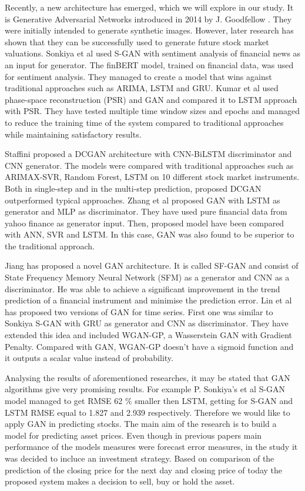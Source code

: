 \documentclass[11pt]{article} %
\begin{document}
Recently, a new architecture has emerged, which we will explore in our study. It is Generative Adversarial Networks introduced in 2014 by J. Goodfellow \cite{gan1}. They were initially intended to generate synthetic images. However, later research has shown that they can be successfully used to generate future stock market valuations. Sonkiya et al \cite{s-gan} used S-GAN with sentiment analysis of financial news as an input for generator. The finBERT model, trained on financial data, was used for sentiment analysis. They managed to create a model that wins against traditional approaches such as ARIMA, LSTM and GRU. Kumar et al  \cite{gan-stock} used phase-space reconstruction (PSR) and GAN and compared it to LSTM approach with PSR. They have tested multiple time window sizes and epochs and managed to reduce the training time of the system compared to traditional approaches while maintaining satisfactory results. 

Staffini \cite{gan-cnn} proposed a DCGAN architecture with CNN-BiLSTM discriminator and CNN generator. The models were compared with traditional approaches such as ARIMAX-SVR, Random Forest, LSTM on 10 different stock market instruments. Both in single-step and in the multi-step prediction, proposed DCGAN outperformed typical approaches. Zhang et al \cite{gan-zhang} proposed GAN with LSTM as generator and MLP as discriminator. They have used pure financial data from yahoo finance as generator input. Then, proposed model have been compared with ANN, SVR and LSTM. In this case, GAN was also found to be superior to the traditional approach.  

Jiang \cite{gan-Jjang} has proposed a novel GAN architecture. It is called SF-GAN and consist of 
State Frequency Memory Neural Network (SFM) as a generator and CNN as a discriminator. 
He was able to achieve a significant improvement in the trend prediction of a financial instrument and minimise the prediction error.  Lin et al \cite{gan-lin} has proposed two versions of GAN for time series. First one was similar to Sonkiya S-GAN with GRU as generator and CNN as discriminator. They have extended this idea and included WGAN-GP, a Wasserstein GAN with Gradient Penalty. Compared with GAN, WGAN-GP doesn't have a sigmoid function and it outputs a scalar value instead of probability. 

Analysing the results of aforementioned researches, it may be stated that GAN algorithms give very promising results. For example P. Sonkiya's et al S-GAN model managed to get RMSE 62 $\% $ smaller then LSTM, getting for S-GAN and LSTM RMSE equal to 1.827 and 2.939 respectively. Therefore we would like to apply GAN in predicting stocks. The main aim of the research is to build a model for predicting asset prices. Even though in previous papers main performance of the models measures were forecast error measures, in the study it was decided to incluce an investment strategy. Based on comparison of the prediction of the closing price for the next day and closing price of today the proposed system makes a decision to sell, buy or hold the asset.
\end{document}
